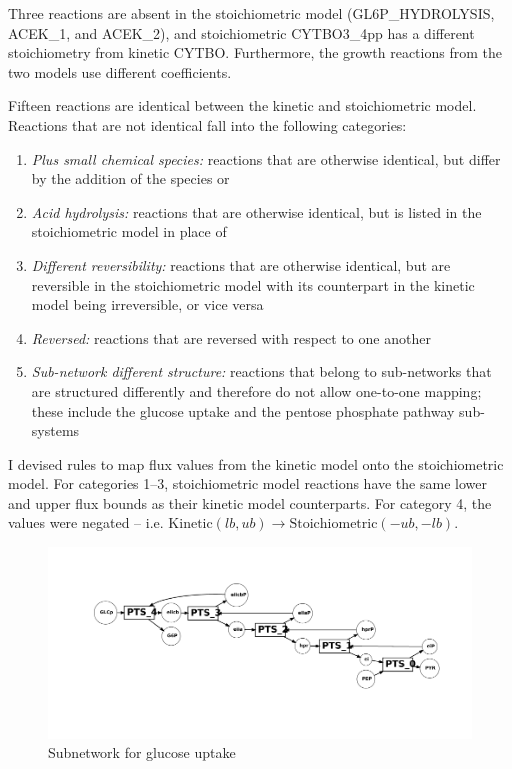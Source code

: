 \documentclass[parskip=full, numbers=noenddot]{scrreprt}
\begin{document}
Three reactions are absent in the stoichiometric model (GL6P\_HYDROLYSIS, ACEK\_1, and ACEK\_2), and stoichiometric CYTBO3\_4pp has a different stoichiometry from kinetic CYTBO. Furthermore, the growth reactions from the two models use different coefficients.

Fifteen reactions are identical between the kinetic and stoichiometric model. Reactions that are not identical fall into the following categories:

\begin{enumerate}
\item \emph{Plus small chemical species:} reactions that are otherwise identical, but differ by the addition of the species  or 
\item \emph{Acid hydrolysis:} reactions that are otherwise identical, but  is listed in the stoichiometric model in place of 
\item \emph{Different reversibility:} reactions that are otherwise identical, but are reversible in the stoichiometric model with its counterpart in the kinetic model being irreversible, or vice versa
\item \emph{Reversed:} reactions that are reversed with respect to one another
  \item \emph{Sub-network different structure:} reactions that belong to sub-networks that are structured differently and therefore do not allow one-to-one mapping; these include the glucose uptake and the pentose phosphate pathway sub-systems
  \end{enumerate}

I devised rules to map flux values from the kinetic model onto the stoichiometric model. For categories 1--3, stoichiometric model reactions have the same lower and upper flux bounds as their kinetic model counterparts. For category 4, the values were negated -- i.e. $ \mathrm{Kinetic } (lb, ub) \rightarrow \mathrm{Stoichiometric } (-ub, -lb)$. %

\begin{figure}[p]
  \centering
  \includegraphics[scale=0.4]{glucoseuptake}
  \caption{Subnetwork for glucose uptake}
  \label{fig:glucoseuptake}
\end{figure}
\end{document}
